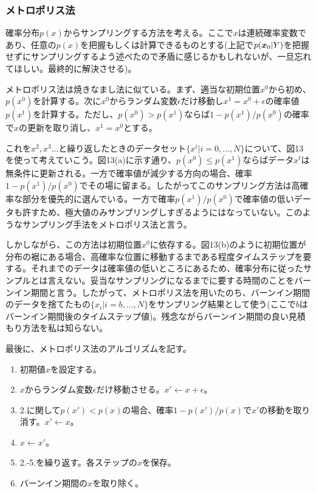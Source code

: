 \documentclass[dvipdfmx, 9pt, a4paper]{jsarticle}
\newcommand{\bm}[1]{{\mbox{\boldmath $#1$}}}
\begin{document}
\subsubsection{メトロポリス法}
確率分布$p(x)$からサンプリングする方法を考える。ここで$x$は連続確率変数であり、任意の$p(x)$を把握もしくは計算できるものとする(上記で$p(\bm x_0|Y)$を把握せずにサンプリングするよう述べたので矛盾に感じるかもしれないが、一旦忘れてほしい。最終的に解決させる)。\par
メトロポリス法は焼きなまし法に似ている。まず、適当な初期位置$x^0$から初め、$p(x^0)$を計算する。次に$x^0$からランダム変数$\epsilon$だけ移動し$x^1=x^0+\epsilon$の確率値$p(x^1)$を計算する。ただし、$p(x^0)>p(x^1)$ならば$1-p(x^1)/p(x^0)$の確率で$x$の更新を取り消し、$x^1=x^0$とする。\par
これを$x^2, x^3...$と繰り返したときのデータセット$\{ x^i|i=0, ..., N \}$について、図13を使って考えていこう。図13(a)に示す通り、$p(x^0)\leq p(x^1)$ならばデータ$x^t$は無条件に更新される。一方で確率値が減少する方向の場合、確率$1-p(x^1)/p(x^0)$でその場に留まる。したがってこのサンプリング方法は高確率な部分を優先的に選んでいる。一方で確率$p(x^1)/p(x^0)$で確率値の低いデータも許すため、極大値のみサンプリングしすぎるようにはなっていない。このようなサンプリング手法をメトロポリス法と言う。\par
しかしながら、この方法は初期位置$x^0$に依存する。図13(b)のように初期位置が分布の裾にある場合、高確率な位置に移動するまである程度タイムステップを要する。それまでのデータは確率値の低いところにあるため、確率分布に従ったサンプルとは言えない。妥当なサンプリングになるまでに要する時間のことをバーンイン期間と言う。したがって、メトロポリス法を用いたのち、バーンイン期間のデータを捨てたもの$\{ x_i|i=b, ...,N \}$をサンプリング結果として使う(ここで$b$はバーンイン期間後のタイムステップ値)。残念ながらバーンイン期間の良い見積もり方法を私は知らない。\par
最後に、メトロポリス法のアルゴリズムを記す。

\begin{tcolorbox}[title=メトロポリス法]
\begin{enumerate}
\item 初期値$x$を設定する。
\item $x$からランダム変数$\epsilon$だけ移動させる。$x' \leftarrow x+\epsilon$。
\item 2.に関して$p(x')<p(x)$の場合、確率$1-p(x')/p(x)$で$x'$の移動を取り消す。$x' \leftarrow x$。
\item $x \leftarrow x'$。
\item 2.-5.を繰り返す。各ステップの$x$を保存。
\item バーンイン期間の$x$を取り除く。
\end{enumerate}
\end{tcolorbox}
\end{document}
